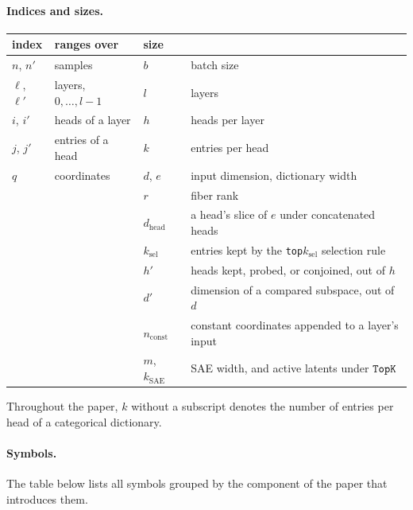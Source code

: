 \paragraph{Indices and sizes.}
\begin{center}\small
\begin{tabular}{@{}llll@{}}
\toprule
index & ranges over & size & \\
\midrule
$n$, $n'$ & samples & $b$ & batch size \\
$\ell$, $\ell'$ & layers, $0,\dots,l-1$ & $l$ & layers \\
$i$, $i'$ & heads of a layer & $h$ & heads per layer \\
$j$, $j'$ & entries of a head & $k$ & entries per head \\
$q$ & coordinates & $d$, $e$ & input dimension, dictionary width \\
\midrule
& & $r$ & fiber rank \\
& & $d_{\mathrm{head}}$ & a head's slice of $e$ under concatenated heads \\
& & $k_{\mathrm{sel}}$ & entries kept by the \texttt{top}$k_{\mathrm{sel}}$ selection rule \\
& & $h'$ & heads kept, probed, or conjoined, out of $h$ \\
& & $d'$ & dimension of a compared subspace, out of $d$ \\
& & $n_{\mathrm{const}}$ & constant coordinates appended to a layer's input \\
& & $m$, $k_{\mathrm{SAE}}$ & SAE width, and active latents under $\mathop{\mathtt{TopK}}\limits$ \\
\bottomrule
\end{tabular}
\end{center}
Throughout the paper, $k$ without a subscript denotes the number of
entries per head of a categorical dictionary.

\paragraph{Symbols.}
The table below lists all symbols grouped by the component of the paper
that introduces them.

